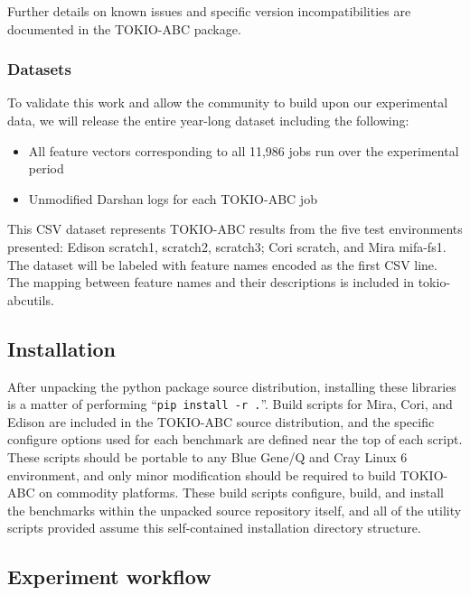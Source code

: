 Further details on known issues and specific version incompatibilities are documented in the TOKIO-ABC package.

\subsubsection{Datasets}

To validate this work and allow the community to build upon our experimental data, we will release the entire  year-long dataset including the following:

\begin{itemize}
\item All feature vectors corresponding to all 11,986 jobs run over the experimental period
\item Unmodified Darshan logs for each TOKIO-ABC job
\end{itemize}

This CSV dataset represents TOKIO-ABC results from the five test environments presented:
Edison scratch1, scratch2, scratch3; Cori scratch, and Mira mifa-fs1.
The dataset will be labeled with feature names encoded as the first CSV line.
The mapping between feature names and their descriptions is included in tokio-abcutils.

\subsection{Installation}

After unpacking the python package source distribution, installing these libraries is a matter of performing ``\texttt{{pip install -r .}}''.
Build scripts for Mira, Cori, and Edison are included in the TOKIO-ABC source distribution, and the specific configure options used for each benchmark are defined near the top of each script.
These scripts should be portable to any Blue Gene/Q and Cray Linux 6 environment, and only minor modification should be required to build TOKIO-ABC on commodity platforms.
These build scripts configure, build, and install the benchmarks within the unpacked source repository itself, and all of the utility scripts provided assume this self-contained installation directory structure.

\subsection{Experiment workflow}

